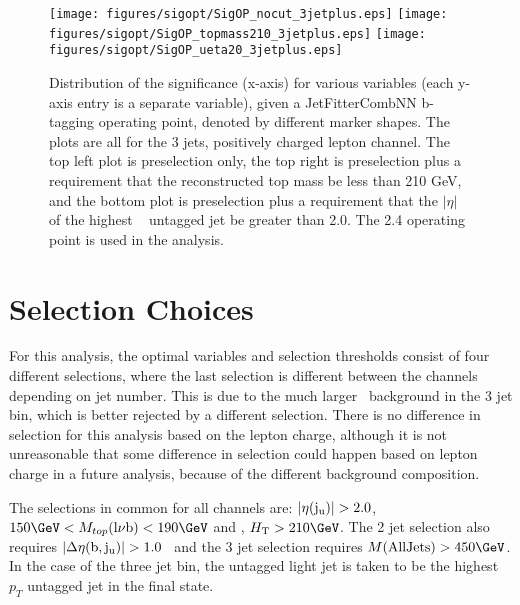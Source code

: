 \begin{figure}[!h!tpb]
 \centering
 \texttt{[image: figures/sigopt/SigOP\_nocut\_3jetplus.eps]}
 \texttt{[image: figures/sigopt/SigOP\_topmass210\_3jetplus.eps]}
 \texttt{[image: figures/sigopt/SigOP\_ueta20\_3jetplus.eps]}
\vspace{-0.5cm}
 \caption{Distribution of the significance (x-axis) for various variables (each y-axis entry is a separate variable), given a JetFitterCombNN b-tagging operating point, denoted by different marker shapes.  The plots are all for the 3 jets, positively charged lepton channel. The top left plot is preselection only, the top right is preselection plus a requirement that the reconstructed top mass be less than 210 GeV, and the bottom plot is preselection plus a requirement that the $|\eta|$ of the highest \pt~ untagged jet be greater than 2.0.  The 2.4 operating point is used in the analysis.}
 \label{fig:OPThreshold_bjet_cuts}
 \end{figure}

\section{Selection Choices}\label{sec:selectionchoices}
For this analysis, the optimal variables and selection thresholds consist of four different selections, where the last selection is different between the channels depending on jet number.  This is due to the much larger \ttbar~background in the 3 jet bin, which is better rejected by a different selection.  There is no difference in selection for this analysis based on the lepton charge, although it is not unreasonable that some difference in selection could happen based on lepton charge in a future analysis, because of the different background composition.

The selections in common for all channels are: $|\eta({\rm j_{u}})|>2.0$, $150\GeV<M_{top}(\rm l\nu b)<190\GeV$ and , $H_{\mathrm{T}}>210\GeV$.  The 2 jet selection also requires $|\Delta\eta(\rm b, j_{u})| > 1.0$~ and the 3 jet selection requires $M(\mathrm{All Jets}) > 450\GeV$.  In the case of the three jet bin, the untagged light jet is taken to be the highest $p_{T}$ untagged jet in the final state.

